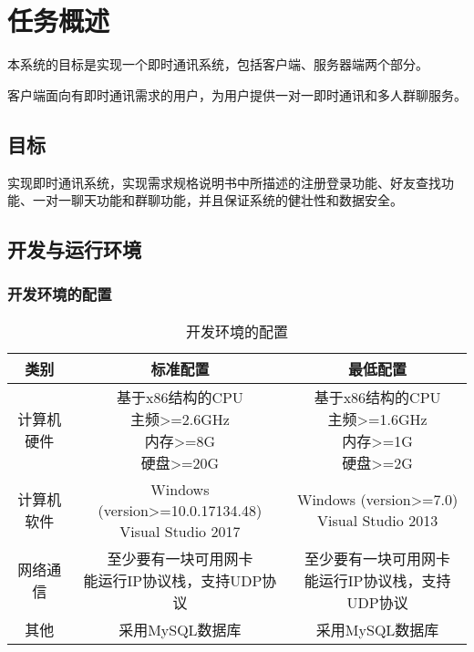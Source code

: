 \chapter{任务概述}
本系统的目标是实现一个即时通讯系统，包括客户端、服务器端两个部分。

客户端面向有即时通讯需求的用户，为用户提供一对一即时通讯和多人群聊服务。

\section{目标}
实现即时通讯系统，实现需求规格说明书中所描述的注册登录功能、好友查找功能、一对一聊天功能和群聊功能，并且保证系统的健壮性和数据安全。

\section{开发与运行环境}

\subsection{开发环境的配置}
\begin{table}[htbp]
\centering
\caption{开发环境的配置} \label{tab:development-environment}
\begin{tabular}{|c|c|c|}
    \hline
    类别 & 标准配置 & 最低配置 \\
    \hline
    计算机硬件 & \tabincell{c}{基于x86结构的CPU\\ 主频>=2.6GHz\\ 内存>=8G\\ 硬盘>=20G} & \tabincell{c}{基于x86结构的CPU\\ 主频>=1.6GHz\\ 内存>=1G\\ 硬盘>=2G} \\
    \hline
    计算机软件 & \tabincell{c}{Windows (version>=10.0.17134.48)\\ Visual Studio 2017} & \tabincell{c}{Windows (version>=7.0)\\ Visual Studio 2013} \\
    \hline
    网络通信 & \tabincell{c}{至少要有一块可用网卡\\ 能运行IP协议栈，支持UDP协议} & \tabincell{c}{至少要有一块可用网卡\\ 能运行IP协议栈，支持UDP协议} \\
    \hline
    其他 & 采用MySQL数据库 & 采用MySQL数据库 \\
    \hline
\end{tabular}
\end{table}

